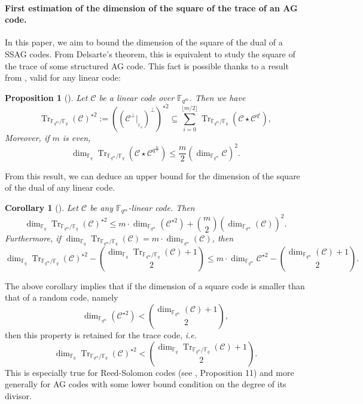 \documentclass[a4paper]{article}
\newtheorem{proposition}[thm]{Proposition}
\newtheorem{coro}[thm]{Corollary}
\theoremstyle{definition}
\theoremstyle{remark}
\newcommand{\calC}{\mathcal{C}}
\newcommand{\fqm}{\mathbb{F}_{q^m}}
\newcommand{\fq}{\mathbb{F}_{q}}
\newcommand{\Tr}[1]{\operatorname{Tr}_{\mathbb{F}_{q^m}/\fq}\left(#1\right)}
\begin{document}
\paragraph{First estimation of the dimension of the square of the trace of an AG code.}
In this paper, we aim to bound the dimension of the square of the dual of a SSAG codes. From Delsarte's theorem, this is equivalent to study the square of the trace of some structured AG code. 
This fact is possible thanks to a result from \cite{MT21}, valid for any linear code:

\begin{proposition}[{\cite[Proposition~15]{MT21}}] \label{prop:Tr_BoundSchurSquare}
 Let $\calC$ be a linear code over $\fqm$. Then we have 
 \begin{equation} \label{eq:key_equation} \Tr{\calC}^{\star2} := ((\calC^{\perp}|_{_{{\mathbb{F}_q}}})^{\perp})^{\star2} \subseteq \sum\limits_{i=0}^{\lfloor{m/2} \rfloor} \Tr{\calC\star \calC^{q^i}},
 \end{equation}
Moreover, if $m$ is even, 
 \begin{equation} \label{eq:dim_m/2} \dim_{\fq} \Tr{\calC\star \calC^{q^{\frac{m}{2}}}} \leq \frac{m}{2} (\dim_{\fqm}\calC)^2.
\end{equation}
\end{proposition}
From this result, we can deduce an upper bound for the dimension of the square of the dual of any linear code.

\begin{coro} [{\cite[Corollary~16]{MT21}}]\label{coro:first_bound_square_of_trace}
 Let $\calC$ be any $\fqm$-linear code. Then 
 \begin{equation} \label{eq:mumford_bound}
  \dim_{\fq}\Tr{\calC}^{\star2} \leq m \cdot \dim_{\fqm}(\calC^{\star 2}) + \binom{m}{2} (\dim_{\fqm}(\calC))^2.
 \end{equation}
 Furthermore, if $\dim_{\fq} \Tr{\calC} = m \cdot \dim_{\fqm}(\calC)$, then 
 \[\dim_{\fq} \Tr{\calC}^{\star2} - \binom{\dim_{\fq} \Tr{\calC}+1}{2} \leq m \cdot \dim_{\fqm} \calC^{\star 2} - \binom{\dim_{\fqm} (\calC)+1}{2}.\]
 
 
\end{coro}
The above corollary implies that if the dimension of a square code is smaller than that of a random code, namely
\[ \dim_{\fqm} (\calC^{\star 2}) < \binom{\dim_{\fqm} (\calC)+1}{2},\]
then this property is retained for the trace code, \emph{i.e.}
\[\dim_{\fq} \Tr{\calC}^{\star 2} < \binom{\dim_{\fq} \Tr{\calC}+1}{2}.\]
This is especially true for Reed-Solomon codes (see \cite{MT21}, Proposition 11) and more generally for AG codes with some lower bound condition on the degree of its divisor.
\end{document}
